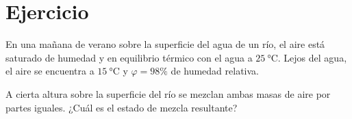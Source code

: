 \section{Ejercicio}\label{ej:Chap12Ejercicio03}
En una mañana de verano sobre la superficie del agua de un río, el aire está saturado de humedad y en equilibrio térmico con el agua a $\SI{25}{\celsius}$. Lejos del agua, el aire se encuentra a $\SI{15}{\celsius}$ y $\varphi=98\%$ de humedad relativa.

A cierta altura sobre la superficie del río se mezclan ambas masas de aire por partes iguales. ¿Cuál es el estado de mezcla resultante?